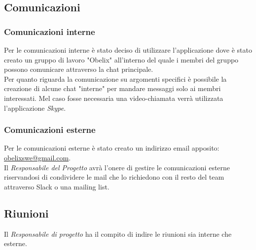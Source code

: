\subsection{Comunicazioni}
\subsubsection{Comunicazioni interne}
Per le comunicazioni interne è stato deciso di utilizzare
l'applicazione  dove è stato creato un gruppo di lavoro
"Obelix" all'interno del quale i membri del gruppo possono comunicare
attraverso la chat principale.\\ 
Per quanto riguarda la comunicazione su argomenti specifici è possibile la creazione di alcune chat "interne" per mandare messaggi solo ai membri interessati.
Mel caso fosse necessaria una video-chiamata verrà utilizzata l'applicazione \emph{Skype}.
\subsubsection{Comunicazioni esterne}
Per le comunicazioni esterne è stato creato un indirizzo email
apposito: \href{mailto:obelixswe@gmail.com}{obelixswe@gmail.com}.\\Il
\emph{ \emph{Responsabile}  del 
	Progetto} avrà l'onere di gestire le comunicazioni esterne
riservandosi di condividere le mail che lo richiedono con il resto del
team attraverso Slack o una mailing list. 


\subsection{Riunioni}
Il \emph{ \emph{Responsabile}  di progetto} ha il compito di indire le riunioni sia interne che esterne.
